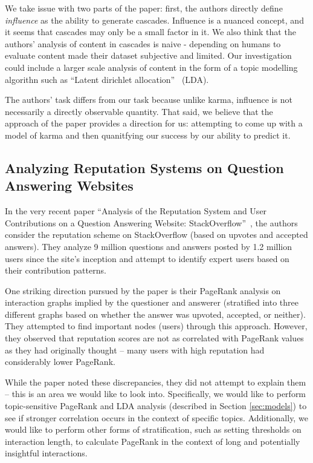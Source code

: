 \documentclass[11pt]{article}
\newcommand{\titlecite}[2]{``#1''~\cite{#2}}
\begin{document}
We take issue with two parts of the paper: first, the authors directly define \textit{influence} 
as the ability to generate cascades. Influence is a nuanced concept, and it seems that cascades
may only be a small factor in it. We also think that the authors' analysis of content in cascades
is naive - depending on humans to evaluate content made their dataset subjective and limited. 
Our investigation
could include a larger scale analysis of content in the form of a topic modelling algorithn
such as \titlecite{Latent dirichlet allocation}{blei2003latent} (LDA).

The authors' task differs from our task because unlike karma, influence is not necessarily
a directly observable quantity. That said, we believe that the approach of the paper provides a direction
for us: attempting to come up with a model of karma and then quanitfying our success
by our ability to predict it.

\subsection{Analyzing Reputation Systems on Question Answering Websites} In the
very recent paper \titlecite{Analysis of the Reputation System and User Contributions on a Question Answering Website: StackOverflow}{movshovitzanalysis}, the authors consider the reputation scheme on
StackOverflow (based on upvotes and accepted answers). They analyze 9
million questions and answers posted by 1.2 million users since the site's
inception and attempt to identify expert users based on their contribution
patterns.

One striking direction pursued by the paper is their PageRank analysis on
interaction graphs implied by the questioner and answerer (stratified into three different graphs
based on whether the answer was upvoted, accepted, or neither). They attempted
to find important nodes (users) through this approach. However, they observed
that reputation scores are not as correlated with PageRank values as they had
originally thought -- many users with high reputation had considerably lower
PageRank.

While the paper noted these discrepancies, they did not attempt to explain them
-- this is an area we would like to look into. Specifically, we would like to perform
topic-sensitive PageRank and LDA analysis (described in Section \ref{sec:models}) 
to see if stronger correlation occurs in the context of specific topics. 
Additionally, we would like to perform other
forms of stratification, such as setting thresholds on interaction length, to
calculate PageRank in the context of long and potentially insightful interactions.
\end{document}
